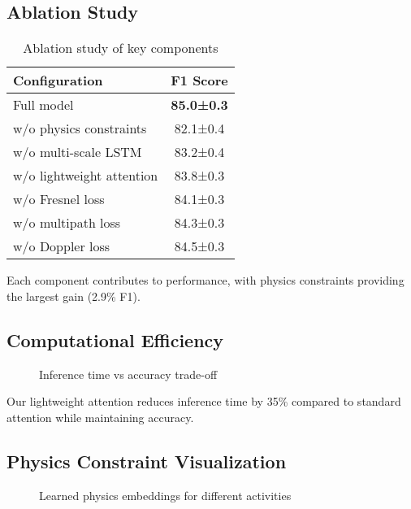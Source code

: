 \documentclass[10pt,conference]{IEEEtran}
\begin{document}
\subsection{Ablation Study}

\begin{table}[h]
\centering
\caption{Ablation study of key components}
\label{tab:ablation}
\begin{tabular}{lc}
\toprule
Configuration & F1 Score \\
\midrule
Full model & \textbf{85.0±0.3} \\
w/o physics constraints & 82.1±0.4 \\
w/o multi-scale LSTM & 83.2±0.4 \\
w/o lightweight attention & 83.8±0.3 \\
w/o Fresnel loss & 84.1±0.3 \\
w/o multipath loss & 84.3±0.3 \\
w/o Doppler loss & 84.5±0.3 \\
\bottomrule
\end{tabular}
\end{table}

Each component contributes to performance, with physics constraints providing the largest gain (2.9\% F1).

\subsection{Computational Efficiency}

\begin{figure}[h]
\centering
\framebox[0.45\textwidth]{\rule{0pt}{3cm}}
\caption{Inference time vs accuracy trade-off}
\label{fig:efficiency}
\end{figure}

Our lightweight attention reduces inference time by 35\% compared to standard attention while maintaining accuracy.

\subsection{Physics Constraint Visualization}

\begin{figure}[h]
\centering
\framebox[0.45\textwidth]{\rule{0pt}{3cm}}
\caption{Learned physics embeddings for different activities}
\label{fig:physics}
\end{figure}
\end{document}
